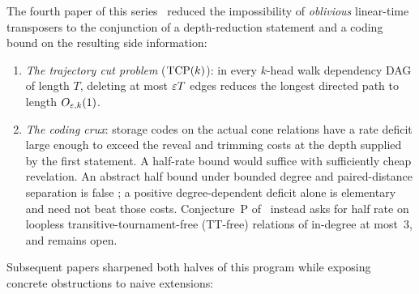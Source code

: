 The fourth paper of this series~\cite{FourthPaper2026} reduced the impossibility of \emph{oblivious} linear-time
transposers to the conjunction of a depth-reduction statement and a coding bound on the resulting side information:
\begin{enumerate}[label=(\roman*)]
\item \emph{The trajectory cut problem} ($\mathrm{TCP}(k)$): in every $k$-head walk dependency DAG of length $T$, deleting at
  most $\varepsilon T$ edges reduces the longest directed path to length $O_{\varepsilon,k}(1)$.
\item \emph{The coding crux}: storage codes on the actual cone relations have a rate deficit large enough to exceed
  the reveal and trimming costs at the depth supplied by the first statement. A half-rate bound would suffice with
  sufficiently cheap revelation. An abstract half bound under bounded degree and paired-distance separation is false
  \cite{StorageCodes2026}; a positive degree-dependent deficit alone is elementary and need not beat those costs.
  Conjecture~P of~\cite{SeventhPaper2026} instead asks for half rate on loopless transitive-tournament-free (TT-free)
  relations of in-degree at most~$3$, and remains open.
\end{enumerate}
Subsequent papers sharpened both halves of this program while exposing concrete obstructions to naive extensions:
